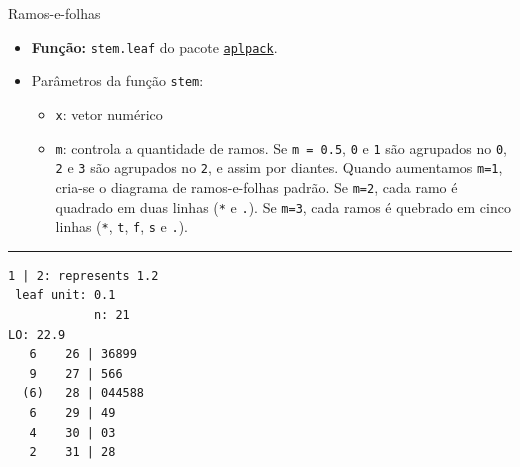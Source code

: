 \documentclass[
  10pt,
  ignorenonframetext,
]{beamer}
\newenvironment{Shaded}{\begin{snugshade}}{\end{snugshade}}
\newcommand{\AttributeTok}[1]{\textcolor[rgb]{0.40,0.45,0.13}{#1}}
\newcommand{\DecValTok}[1]{\textcolor[rgb]{0.68,0.00,0.00}{#1}}
\newcommand{\FunctionTok}[1]{\textcolor[rgb]{0.28,0.35,0.67}{#1}}
\newcommand{\NormalTok}[1]{\textcolor[rgb]{0.00,0.23,0.31}{#1}}
\newcommand{\OtherTok}[1]{\textcolor[rgb]{0.00,0.23,0.31}{#1}}
\newcommand{\SpecialCharTok}[1]{\textcolor[rgb]{0.37,0.37,0.37}{#1}}
\newcommand{\StringTok}[1]{\textcolor[rgb]{0.13,0.47,0.30}{#1}}
\providecommand{\tightlist}{%
  \setlength{\itemsep}{0pt}\setlength{\parskip}{0pt}}\usepackage{longtable,booktabs,array}
\newcommand*{\regrafina}{\rule{\textwidth}{0.5pt}}
\begin{document}
\begin{frame}[fragile]{Ramos-e-folhas}
\protect\hypertarget{ramos-e-folhas-2}{}
\begin{itemize}
\tightlist
\item
  \textbf{Função:} \texttt{stem.leaf} do pacote
  \href{https://www.uni-bielefeld.de/fakultaeten/wirtschaftswissenschaften/fakultaet/lehrende-ehemalige/pwolf/wolf_aplpack/index.xml}{\texttt{aplpack}}.
\item
  Parâmetros da função \texttt{stem}:

  \begin{itemize}
  \tightlist
  \item
    \texttt{x}: vetor numérico
  \item
    \texttt{m}: controla a quantidade de ramos. Se \texttt{m\ =\ 0.5},
    \texttt{0} e \texttt{1} são agrupados no \texttt{0}, \texttt{2} e
    \texttt{3} são agrupados no \texttt{2}, e assim por diantes. Quando
    aumentamos \texttt{m=1}, cria-se o diagrama de ramos-e-folhas
    padrão. Se \texttt{m=2}, cada ramo é quadrado em duas linhas
    (\texttt{*} e \texttt{.}). Se \texttt{m=3}, cada ramos é quebrado em
    cinco linhas (\texttt{*}, \texttt{t}, \texttt{f}, \texttt{s} e
    \texttt{.}).
  \end{itemize}
\end{itemize}

\vfill

\regrafina

\begin{Shaded}
\end{Shaded}
\end{frame}

\begin{frame}[fragile]
\begin{verbatim}
1 | 2: represents 1.2
 leaf unit: 0.1
            n: 21
LO: 22.9
   6    26 | 36899
   9    27 | 566
  (6)   28 | 044588
   6    29 | 49
   4    30 | 03
   2    31 | 28
\end{verbatim}
\end{frame}
\end{document}
